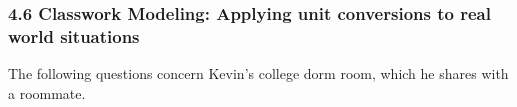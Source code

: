 

\fancyhead[LE]{\thepage}



\subsubsection*{4.6 Classwork Modeling: Applying unit conversions to real world situations}

The following questions concern Kevin’s college dorm room, which he shares with a roommate.

